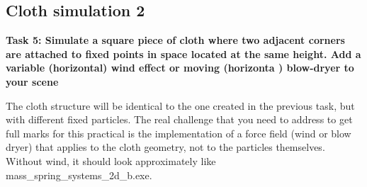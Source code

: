 \documentclass[12pt]{article}
\begin{document}
\subsection*{Cloth simulation 2}

\textbf{Task 5: Simulate a square piece of cloth where two adjacent corners are attached to fixed points in space located at the same height. Add a variable (horizontal) wind effect or moving (horizonta ) blow-dryer to your scene}

The cloth structure will be identical to the one created in the previous task, but with different fixed particles. The real challenge that you need to address to get full marks for this practical is the implementation of a force field (wind or blow dryer) that applies to the cloth geometry, not to the particles themselves. Without wind, it should look approximately like mass\_spring\_systems\_2d\_b.exe.






\end{document}
